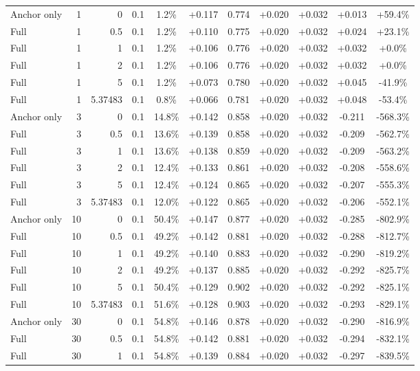\begin{table}[htbp]
\begin{tabular}{lrrrccccccc}
Anchor only & 1 & 0 & 0.1 & 1.2\% & +0.117 & 0.774 & +0.020 & +0.032 & +0.013 & +59.4\% \\
Full & 1 & 0.5 & 0.1 & 1.2\% & +0.110 & 0.775 & +0.020 & +0.032 & +0.024 & +23.1\% \\
Full & 1 & 1 & 0.1 & 1.2\% & +0.106 & 0.776 & +0.020 & +0.032 & +0.032 & +0.0\% \\
Full & 1 & 2 & 0.1 & 1.2\% & +0.106 & 0.776 & +0.020 & +0.032 & +0.032 & +0.0\% \\
Full & 1 & 5 & 0.1 & 1.2\% & +0.073 & 0.780 & +0.020 & +0.032 & +0.045 & -41.9\% \\
Full & 1 & 5.37483 & 0.1 & 0.8\% & +0.066 & 0.781 & +0.020 & +0.032 & +0.048 & -53.4\% \\
Anchor only & 3 & 0 & 0.1 & 14.8\% & +0.142 & 0.858 & +0.020 & +0.032 & -0.211 & -568.3\% \\
Full & 3 & 0.5 & 0.1 & 13.6\% & +0.139 & 0.858 & +0.020 & +0.032 & -0.209 & -562.7\% \\
Full & 3 & 1 & 0.1 & 13.6\% & +0.138 & 0.859 & +0.020 & +0.032 & -0.209 & -563.2\% \\
Full & 3 & 2 & 0.1 & 12.4\% & +0.133 & 0.861 & +0.020 & +0.032 & -0.208 & -558.6\% \\
Full & 3 & 5 & 0.1 & 12.4\% & +0.124 & 0.865 & +0.020 & +0.032 & -0.207 & -555.3\% \\
Full & 3 & 5.37483 & 0.1 & 12.0\% & +0.122 & 0.865 & +0.020 & +0.032 & -0.206 & -552.1\% \\
Anchor only & 10 & 0 & 0.1 & 50.4\% & +0.147 & 0.877 & +0.020 & +0.032 & -0.285 & -802.9\% \\
Full & 10 & 0.5 & 0.1 & 49.2\% & +0.142 & 0.881 & +0.020 & +0.032 & -0.288 & -812.7\% \\
Full & 10 & 1 & 0.1 & 49.2\% & +0.140 & 0.883 & +0.020 & +0.032 & -0.290 & -819.2\% \\
Full & 10 & 2 & 0.1 & 49.2\% & +0.137 & 0.885 & +0.020 & +0.032 & -0.292 & -825.7\% \\
Full & 10 & 5 & 0.1 & 50.4\% & +0.129 & 0.902 & +0.020 & +0.032 & -0.292 & -825.1\% \\
Full & 10 & 5.37483 & 0.1 & 51.6\% & +0.128 & 0.903 & +0.020 & +0.032 & -0.293 & -829.1\% \\
Anchor only & 30 & 0 & 0.1 & 54.8\% & +0.146 & 0.878 & +0.020 & +0.032 & -0.290 & -816.9\% \\
Full & 30 & 0.5 & 0.1 & 54.8\% & +0.142 & 0.881 & +0.020 & +0.032 & -0.294 & -832.1\% \\
Full & 30 & 1 & 0.1 & 54.8\% & +0.139 & 0.884 & +0.020 & +0.032 & -0.297 & -839.5\% \\

\end{tabular}
\end{table}
